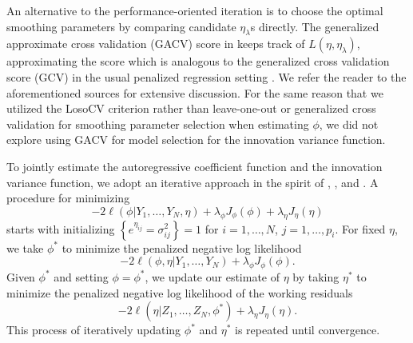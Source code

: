 \bigskip

An alternative to the performance-oriented iteration is to choose the optimal smoothing parameters by comparing candidate $\eta_\lambda$s directly. The generalized approximate cross validation (GACV) score in \cite{xiang1996generalized} keeps track of $L\left( \eta,\eta_\lambda \right)$, approximating the score which is analogous to the generalized cross validation score (GCV) in the usual penalized regression setting \citep{wahba1990spline}. We refer the reader to the aforementioned sources for extensive discussion. For the same reason that we utilized the LosoCV criterion rather than leave-one-out or generalized cross validation for smoothing parameter selection when estimating $\phi$, we did not explore using GACV for model selection for the innovation variance function.

\bigskip

To jointly estimate the autoregressive coefficient function and the innovation variance function, we adopt an iterative approach in the spirit of \cite{huang2006covariance}, \cite{huang2007estimation}, and \cite{pourahmadi2000maximum}. A procedure for minimizing 
\[
-2\ell\left(\phi \vert Y_1, \dots, Y_N , \eta \right) + \lambda_\phi  J_\phi\left(\phi\right) + \lambda_\eta  J_\eta\left(\eta\right)
\]
starts with initializing $\left\{ e^{\eta_{ij}} = \sigma^2_{ij}\right\} = 1$ for $i = 1,\dots, N$, $j = 1,\dots, p_i$.  For fixed $\eta$, we take $\phi^*$ to minimize the penalized negative log likelihood 
\[
-2\ell\left(\phi, \eta\vert Y_1, \dots, Y_N\right) + \lambda_\phi  J_\phi\left(\phi\right).
\]
\noindent
Given $\phi^*$ and setting $\phi = \phi^*$, we update our estimate of $\eta$ by taking $\eta^*$ to minimize the penalized negative log likelihood of the working residuals  
\[
-2\ell\left( \eta \vert Z_1,\dots, Z_N, \phi^* \right) + \lambda_\eta  J_\eta\left(\eta\right).
\]
This process of iteratively updating $\phi^*$ and ${\eta}^*$ is repeated until convergence. 




